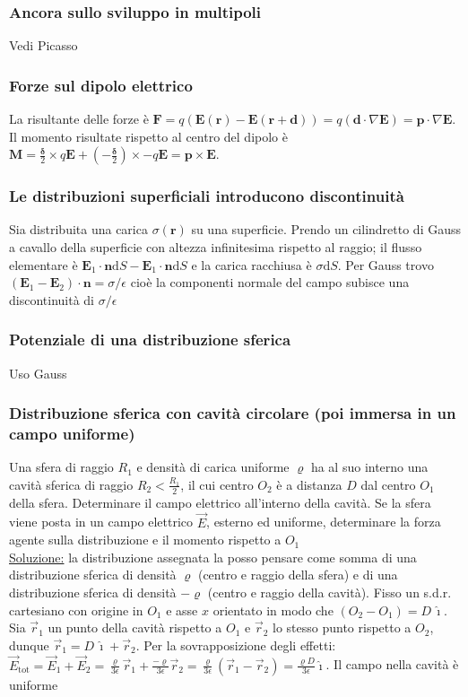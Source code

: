 \documentclass[11pt,a4paper]{article}
\newcommand{\de}{\mathrm d}
\begin{document}
\subsubsection{Ancora sullo sviluppo in multipoli}
Vedi Picasso

\subsubsection{Forze sul dipolo elettrico}
La risultante delle forze è $\mathbf F = q(\mathbf E(\mathbf r) - \mathbf E(\mathbf r + \mathbf d)) = q (\mathbf d \cdot \nabla\mathbf E) = \mathbf p \cdot \nabla\mathbf E$. Il momento risultate rispetto al centro del dipolo è $\mathbf M = \frac{\mathbf\delta}2 \times q\mathbf E + (-\frac{\mathbf\delta}2) \times -q\mathbf E = \mathbf p \times \mathbf E$.

\subsubsection{Le distribuzioni superficiali introducono discontinuità}
Sia distribuita una carica $\sigma(\mathbf r)$ su una superficie. Prendo un cilindretto di Gauss a cavallo della superficie con altezza infinitesima rispetto al raggio; il flusso elementare è $\mathbf E_1 \cdot \mathbf n \de S - \mathbf E_1 \cdot \mathbf n \de S$ e la carica racchiusa è $\sigma \de S$. Per Gauss trovo $(\mathbf E_1 - \mathbf E_2)\cdot\mathbf n = \sigma/\epsilon$ cioè la componenti normale del campo subisce una discontinuità di $\sigma/\epsilon$

\subsubsection{Potenziale di una distribuzione sferica}
Uso Gauss

\subsubsection{Distribuzione sferica con cavità circolare (poi immersa in un campo uniforme)}
Una sfera di raggio $R_1$ e densità di carica uniforme $\varrho$ ha al suo interno una cavità sferica di raggio $R_2<\frac{R_1}{2}$, il cui centro $O_2$ è a distanza $D$ dal centro $O_1$ della sfera. Determinare il campo elettrico all'interno della cavità. Se la sfera viene posta in un campo elettrico $\vec E$, esterno ed uniforme, determinare la forza agente sulla distribuzione e il momento rispetto a $O_1$\\
\underline{Soluzione:} la distribuzione assegnata la posso pensare come somma di una distribuzione sferica di densità $\varrho$ (centro e raggio della sfera) e di una distribuzione sferica di densità $-\varrho$ (centro e raggio della cavità). Fisso un s.d.r. cartesiano con origine in $O_1$ e asse $x$ orientato in modo che $(O_2-O_1)=D\,\hat\imath$. Sia $\vec r_1$ un punto della cavità rispetto a $O_1$ e $\vec r_2$ lo stesso punto rispetto a $O_2$, dunque $\vec r_1=D\,\hat\imath+\vec r_2$. Per la sovrapposizione degli effetti: $\vec E_\mathrm{tot}=\vec E_1+\vec E_2=\frac{\varrho}{3\epsilon}\vec r_1+\frac{-\varrho}{3\epsilon}\vec r_2=\frac{\varrho}{3\epsilon}(\vec r_1-\vec r_2)=\frac{\varrho D}{3\epsilon}\hat\imath$. Il campo nella cavità è uniforme
\end{document}
